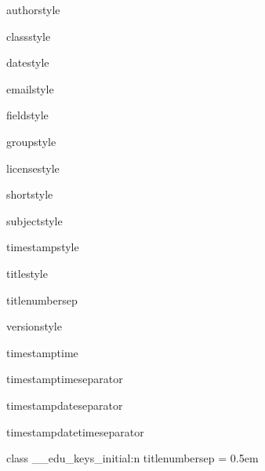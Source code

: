 \begin{option}{authorstyle}
\begin{option}{classstyle}
\begin{option}{datestyle}
\begin{option}{emailstyle}
\begin{option}{fieldstyle}
\begin{option}{groupstyle}
\begin{option}{licensestyle}
\begin{option}{shortstyle}
\begin{option}{subjectstyle}
\begin{option}{timestampstyle}
\begin{option}{titlestyle}
\begin{option}{titlenumbersep}
\begin{option}{versionstyle}
\begin{option}{timestamptime}
\begin{option}{timestamptimeseparator}
\begin{option}{timestampdateseparator}
\begin{option}{timestampdatetimeseparator}
\begin{MacroCode}{class}
\__edu_keys_initial:n {
  titlenumbersep = 0.5em
}

\end{MacroCode}
\end{option}
\end{option}
\end{option}
\end{option}
\end{option}
\end{option}
\end{option}
\end{option}
\end{option}
\end{option}
\end{option}
\end{option}
\end{option}
\end{option}
\end{option}
\end{option}
\end{option}
